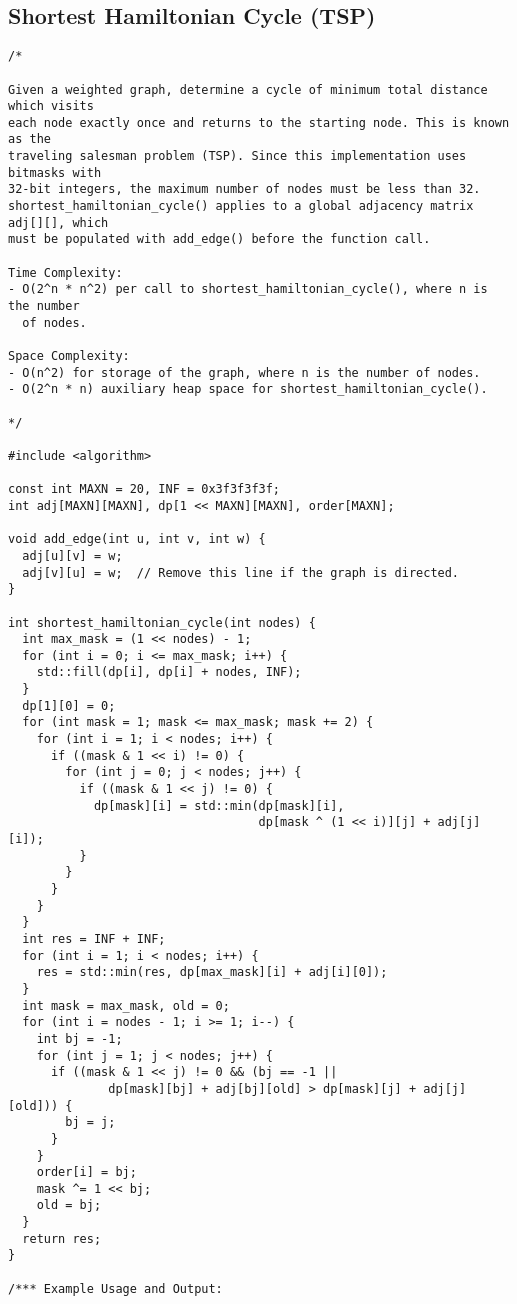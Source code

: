 \subsection{Shortest Hamiltonian Cycle (TSP)}
\begin{lstlisting}
/*

Given a weighted graph, determine a cycle of minimum total distance which visits
each node exactly once and returns to the starting node. This is known as the
traveling salesman problem (TSP). Since this implementation uses bitmasks with
32-bit integers, the maximum number of nodes must be less than 32.
shortest_hamiltonian_cycle() applies to a global adjacency matrix adj[][], which
must be populated with add_edge() before the function call.

Time Complexity:
- O(2^n * n^2) per call to shortest_hamiltonian_cycle(), where n is the number
  of nodes.

Space Complexity:
- O(n^2) for storage of the graph, where n is the number of nodes.
- O(2^n * n) auxiliary heap space for shortest_hamiltonian_cycle().

*/

#include <algorithm>

const int MAXN = 20, INF = 0x3f3f3f3f;
int adj[MAXN][MAXN], dp[1 << MAXN][MAXN], order[MAXN];

void add_edge(int u, int v, int w) {
  adj[u][v] = w;
  adj[v][u] = w;  // Remove this line if the graph is directed.
}

int shortest_hamiltonian_cycle(int nodes) {
  int max_mask = (1 << nodes) - 1;
  for (int i = 0; i <= max_mask; i++) {
    std::fill(dp[i], dp[i] + nodes, INF);
  }
  dp[1][0] = 0;
  for (int mask = 1; mask <= max_mask; mask += 2) {
    for (int i = 1; i < nodes; i++) {
      if ((mask & 1 << i) != 0) {
        for (int j = 0; j < nodes; j++) {
          if ((mask & 1 << j) != 0) {
            dp[mask][i] = std::min(dp[mask][i],
                                   dp[mask ^ (1 << i)][j] + adj[j][i]);
          }
        }
      }
    }
  }
  int res = INF + INF;
  for (int i = 1; i < nodes; i++) {
    res = std::min(res, dp[max_mask][i] + adj[i][0]);
  }
  int mask = max_mask, old = 0;
  for (int i = nodes - 1; i >= 1; i--) {
    int bj = -1;
    for (int j = 1; j < nodes; j++) {
      if ((mask & 1 << j) != 0 && (bj == -1 ||
              dp[mask][bj] + adj[bj][old] > dp[mask][j] + adj[j][old])) {
        bj = j;
      }
    }
    order[i] = bj;
    mask ^= 1 << bj;
    old = bj;
  }
  return res;
}

/*** Example Usage and Output:


\end{lstlisting}
